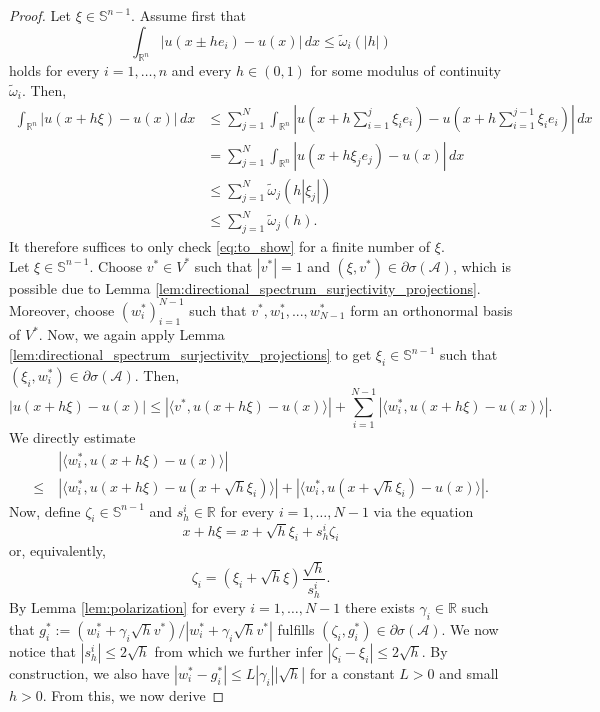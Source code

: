 \documentclass[10pt,a4paper]{amsart}
\newcommand{\A}{\mathcal{A}}
\newcommand{\R}{\mathbb{R}}
\newcommand{\s}{\mathbb{S}}
\begin{document}
\begin{proof}
    Let $\xi \in \s^{n-1}$. Assume first that  
    \[
        \int_{\R^n} |u(x \pm h e_i)- u(x)| \, dx \leq \tilde \omega_i(|h|)
    \]
    holds for every $i = 1,\ldots, n$ and every $h \in (0,1)$ for some modulus of continuity $\tilde \omega_i$.
    Then,
    \begin{align}
    \label{eq:to_show_2}
        \int_{\R^n} |u(x + h \xi) - u(x)| \, dx 
        &\leq \sum_{j = 1}^N \int_{\R^n} \left|u \left(x + h\sum_{i = 1}^j \xi_i e_i \right) - u \left(x + h\sum_{i = 1}^{j -1} \xi_i e_i \right) \right| \, dx \nonumber \\
        &= \sum_{j = 1}^N \int_{\R^n} |u(x + h\xi_j e_j) - u(x)| \, dx  \nonumber \\
        &\leq \sum_{j = 1}^N \tilde \omega_j(h|\xi_j|)  \nonumber \\
        &\leq \sum_{j = 1}^N \tilde \omega_j(h).
    \end{align}
    It therefore suffices to only check \eqref{eq:to_show} for a finite number of $\xi$.
    \\
    Let $\xi \in \s^{n-1}$. Choose $v^* \in V^*$ such that $|v^*| = 1$ and $(\xi, v^*) \in \partial \sigma (\A)$, which is possible due to Lemma \ref{lem:directional_spectrum_surjectivity_projections}. Moreover, choose $(w_i^*)_{i = 1}^{N-1}$ such that $v^*, w_1^*, ..., w_{N - 1}^*$ form an orthonormal basis of $V^*$. Now, we again apply Lemma \ref{lem:directional_spectrum_surjectivity_projections} to get $\xi_{i} \in \s^{n-1}$ such that $(\xi_i, w_i^*) \in \partial \sigma(\A)$. Then,
    \[
        |u(x + h\xi) - u(x)| \leq |\langle v^*, u(x + h\xi) - u(x) \rangle| + \sum_{i = 1}^{N - 1}|\langle w_i^*,u(x + h\xi) - u(x)\rangle |.
    \]
    We directly estimate 
    \begin{align*}
        &|\langle w_i^*, u(x + h\xi) - u(x)\rangle| \\
        \leq ~ & |\langle w_i^*, u(x + h\xi) - u(x + \sqrt h \xi_{i})\rangle| + |\langle w_i^*, u(x + \sqrt h \xi_{i}) - u(x)\rangle|.
    \end{align*}
    Now, define $\zeta_i \in \s^{n-1}$ and $s_h^i \in \R$ for every $i = 1, \ldots, N-1$ via the equation
    \[
        x + h\xi = x + \sqrt h \xi_{i} + s_h^i \zeta_{i}
    \]
    or, equivalently,
    \[
        \zeta_i = (\xi_i + \sqrt h \xi)\frac{\sqrt h}{s_h^i}.
    \]
    By Lemma \ref{lem:polarization} for every $i = 1, \ldots, N-1$ there exists $\gamma_i \in \R$ such that $g_i^* := (w_i^* + \gamma_i \sqrt h v^*)/|w_i^* + \gamma_i \sqrt h v^*|$ fulfills $(\zeta_i, g_i^*) \in \partial \sigma(\A)$. We now notice that $|s_h^i| \leq 2\sqrt h$ from which we further infer $|\zeta_i - \xi_i| \leq 2\sqrt h$. By construction, we also have $|w^*_i - g^*_i| \leq L|\gamma_i||\sqrt h|$ for a constant $L > 0$ and small $h > 0$. From this, we now derive  

\end{proof}
\end{document}
